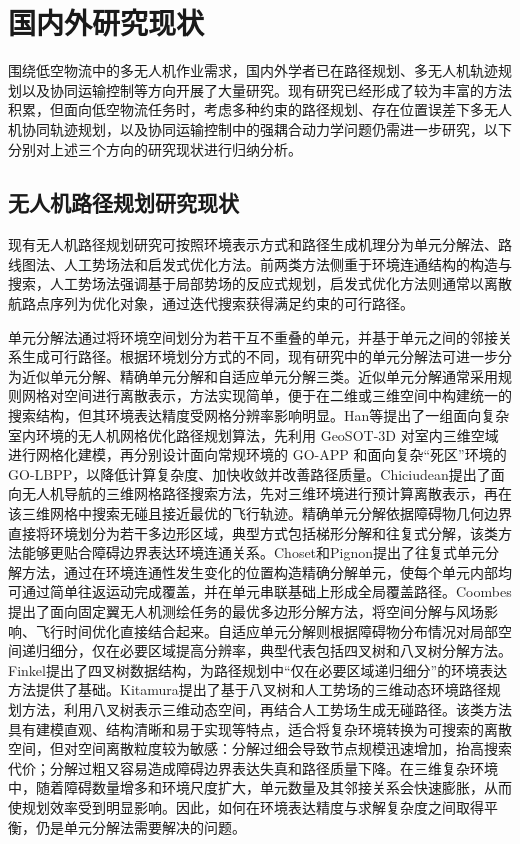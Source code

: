 \section{国内外研究现状}

围绕低空物流中的多无人机作业需求，国内外学者已在路径规划、多无人机轨迹规划以及协同运输控制等方向开展了大量研究。现有研究已经形成了较为丰富的方法积累，但面向低空物流任务时，考虑多种约束的路径规划、存在位置误差下多无人机协同轨迹规划，以及协同运输控制中的强耦合动力学问题仍需进一步研究，以下分别对上述三个方向的研究现状进行归纳分析。

\subsection{无人机路径规划研究现状}

现有无人机路径规划研究可按照环境表示方式和路径生成机理分为单元分解法、路线图法、人工势场法和启发式优化方法\cite{HKGC202302003,HKJJ202204030}。前两类方法侧重于环境连通结构的构造与搜索，人工势场法强调基于局部势场的反应式规划，启发式优化方法则通常以离散航路点序列为优化对象，通过迭代搜索获得满足约束的可行路径。

单元分解法通过将环境空间划分为若干互不重叠的单元，并基于单元之间的邻接关系生成可行路径。根据环境划分方式的不同，现有研究中的单元分解法可进一步分为近似单元分解、精确单元分解和自适应单元分解三类。近似单元分解通常采用规则网格对空间进行离散表示，方法实现简单，便于在二维或三维空间中构建统一的搜索结构，但其环境表达精度受网格分辨率影响明显。Han等提出了一组面向复杂室内环境的无人机网格优化路径规划算法，先利用 GeoSOT-3D 对室内三维空域进行网格化建模，再分别设计面向常规环境的 GO-APP 和面向复杂“死区”环境的 GO-LBPP，以降低计算复杂度、加快收敛并改善路径质量\cite{han2022grid}。Chiciudean提出了面向无人机导航的三维网格路径搜索方法，先对三维环境进行预计算离散表示，再在该三维网格中搜索无碰且接近最优的飞行轨迹\cite{chiciudean2022pathfinding}。精确单元分解依据障碍物几何边界直接将环境划分为若干多边形区域，典型方式包括梯形分解和往复式分解，该类方法能够更贴合障碍边界表达环境连通关系。Choset和Pignon提出了往复式单元分解方法，通过在环境连通性发生变化的位置构造精确分解单元，使每个单元内部均可通过简单往返运动完成覆盖，并在单元串联基础上形成全局覆盖路径\cite{choset1998coverage}。Coombes提出了面向固定翼无人机测绘任务的最优多边形分解方法，将空间分解与风场影响、飞行时间优化直接结合起来\cite{coombes2018optimal}。自适应单元分解则根据障碍物分布情况对局部空间递归细分，仅在必要区域提高分辨率，典型代表包括四叉树和八叉树分解方法。Finkel提出了四叉树数据结构，为路径规划中“仅在必要区域递归细分”的环境表达方法提供了基础\cite{finkel1974quad}。Kitamura提出了基于八叉树和人工势场的三维动态环境路径规划方法，利用八叉树表示三维动态空间，再结合人工势场生成无碰路径\cite{kitamura1995path}。该类方法具有建模直观、结构清晰和易于实现等特点，适合将复杂环境转换为可搜索的离散空间，但对空间离散粒度较为敏感：分解过细会导致节点规模迅速增加，抬高搜索代价；分解过粗又容易造成障碍边界表达失真和路径质量下降。在三维复杂环境中，随着障碍数量增多和环境尺度扩大，单元数量及其邻接关系会快速膨胀，从而使规划效率受到明显影响。因此，如何在环境表达精度与求解复杂度之间取得平衡，仍是单元分解法需要解决的问题。

